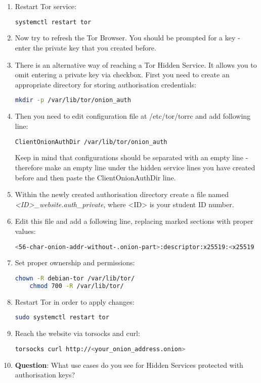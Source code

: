 \begin{enumerate}
\begin{lstlisting}[language=bash]
    \end{lstlisting}
    \item Restart Tor service:
    \begin{lstlisting}[language=bash]
    systemctl restart tor
    \end{lstlisting}
    \item Now try to refresh the Tor Browser. You should be prompted for a key - enter the private key that you created before.
    \item There is an alternative way of reaching a Tor Hidden Service. It allows you to omit entering a private key via checkbox. First you need to create an appropriate directory for storing authorisation credentials:
    \begin{lstlisting}[language=bash]
    mkdir -p /var/lib/tor/onion_auth
    \end{lstlisting}
    \item Then you need to edit configuration file at /etc/tor/torrc and add following line:
    \begin{lstlisting}[language=bash]
    ClientOnionAuthDir /var/lib/tor/onion_auth
    \end{lstlisting}
    Keep in mind that configurations should be separated with an empty line - therefore make an empty line under the hidden service lines you have created before and then paste the ClientOnionAuthDir line.
    \item Within the newly created authorisation directory create a file named \textit{<ID>\_website.auth\_private}, where <ID> is your student ID number.
    \item Edit this file and add a following line, replacing marked sections with proper values:
    \begin{lstlisting}[language=bash, breaklines=true, breakatwhitespace=true]
    <56-char-onion-addr-without-.onion-part>:descriptor:x25519:<x25519 private key in base32>
    \end{lstlisting}
    \item Set proper ownership and permissions:
    \begin{lstlisting}[language=bash]
    chown -R debian-tor /var/lib/tor/
    chmod 700 -R /var/lib/tor/  
    \end{lstlisting}
    \item Restart Tor in order to apply changes:
    \begin{lstlisting}[language=bash]
    sudo systemctl restart tor 
    \end{lstlisting}
    \item Reach the website via torsocks and curl:
    \begin{lstlisting}[language=bash]
    torsocks curl http://<your_onion_address.onion>
    \end{lstlisting}
    \item \textbf{Question}: What use cases do you see for Hidden Services protected with authorisation keys?
\end{enumerate}

